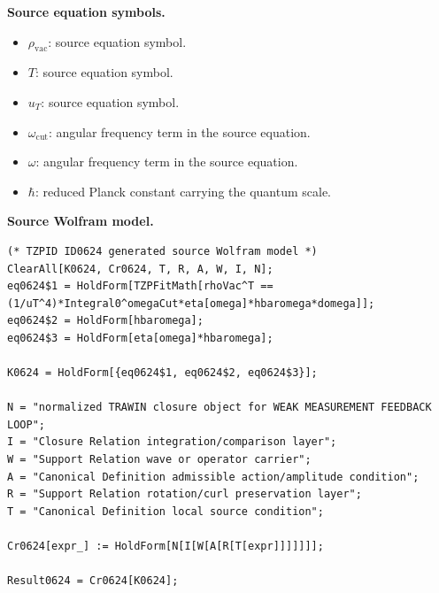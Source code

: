\begin{minipage}[t]{0.49\linewidth}
\begingroup
\small
\raggedright
\textbf{Source equation symbols.}\par
\begin{itemize}[leftmargin=1.35em,itemsep=1pt,topsep=1pt,parsep=0pt]
    \item $\rho_{\mathrm{vac}}$: source equation symbol.
    \item $T$: source equation symbol.
    \item $u_T$: source equation symbol.
    \item $\omega_{\mathrm{cut}}$: angular frequency term in the source equation.
    \item $\omega$: angular frequency term in the source equation.
    \item $\hbar$: reduced Planck constant carrying the quantum scale.
\end{itemize}
\endgroup
\end{minipage}\hfill
\begin{minipage}[t]{0.47\linewidth}
\begingroup
\scriptsize
\raggedright
\textbf{Source Wolfram model.}\par
\begin{Verbatim}[fontsize=\tiny,breaklines=true,breakanywhere=true]
(* TZPID ID0624 generated source Wolfram model *)
ClearAll[K0624, Cr0624, T, R, A, W, I, N];
eq0624$1 = HoldForm[TZPFitMath[rhoVac^T == (1/uT^4)*Integral0^omegaCut*eta[omega]*hbaromega*domega]];
eq0624$2 = HoldForm[hbaromega];
eq0624$3 = HoldForm[eta[omega]*hbaromega];

K0624 = HoldForm[{eq0624$1, eq0624$2, eq0624$3}];

N = "normalized TRAWIN closure object for WEAK MEASUREMENT FEEDBACK LOOP";
I = "Closure Relation integration/comparison layer";
W = "Support Relation wave or operator carrier";
A = "Canonical Definition admissible action/amplitude condition";
R = "Support Relation rotation/curl preservation layer";
T = "Canonical Definition local source condition";

Cr0624[expr_] := HoldForm[N[I[W[A[R[T[expr]]]]]]];

Result0624 = Cr0624[K0624];
\end{Verbatim}
\endgroup
\end{minipage}

